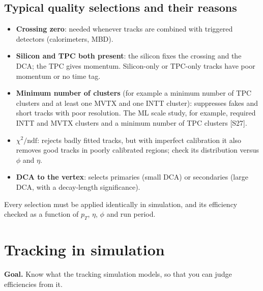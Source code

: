 \documentclass[11pt,letterpaper]{article}
\newcommand{\goal}[1]{\par\noindent\textbf{Goal.} #1\par}
\begin{document}
\subsection{Typical quality selections and their reasons}
\begin{itemize}
\item \textbf{Crossing zero}: needed whenever tracks are combined with triggered detectors (calorimeters, MBD).
\item \textbf{Silicon and TPC both present}: the silicon fixes the crossing and the DCA; the TPC gives momentum. Silicon-only or TPC-only tracks have poor momentum or no time tag.
\item \textbf{Minimum number of clusters} (for example a minimum number of TPC clusters and at least one MVTX and one INTT cluster): suppresses fakes and short tracks with poor resolution. The ML scale study, for example, required INTT and MVTX clusters and a minimum number of TPC clusters [S27].
\item \textbf{$\chi^2/\mathrm{ndf}$}: rejects badly fitted tracks, but with imperfect calibration it also removes good tracks in poorly calibrated regions; check its distribution versus $\phi$ and $\eta$.
\item \textbf{DCA to the vertex}: selects primaries (small DCA) or secondaries (large DCA, with a decay-length significance).
\end{itemize}
Every selection must be applied identically in simulation, and its efficiency checked as a function of $p_T$, $\eta$, $\phi$ and run period.

\section{Tracking in simulation}
\goal{Know what the tracking simulation models, so that you can judge efficiencies from it.}
\end{document}
